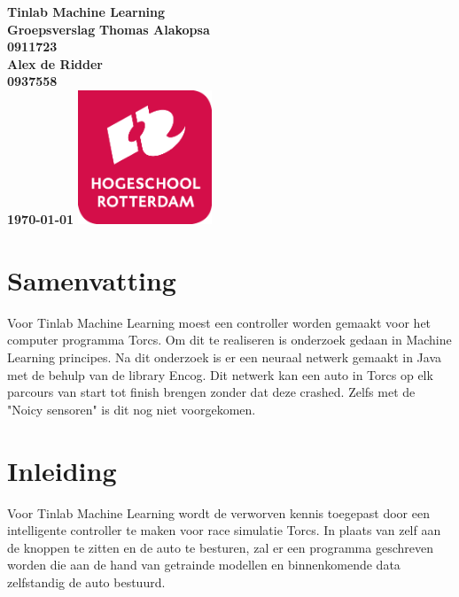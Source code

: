 \documentclass{article}
\begin{document}
\sffamily
\begin{titlepage}
  \centering
    \vfill
    {\bfseries\Huge
      Tinlab Machine Learning \\
      Groepsverslag
        \vskip2cm
      }
      {\bfseries\Large
      	Thomas Alakopsa\\
      	{ \bfseries\normalsize
      	0911723\\
      	}
      }
      {\bfseries\Large
      	Alex de Ridder\\
      	{ \bfseries\normalsize
      	0937558\\
      	}
      }
      {
        \bfseries\normalsize
        \vskip2cm
        \today
    }    
    \vfill
    \includegraphics[width=4cm]{logohr.png}
    \vfill
    \vfill
\end{titlepage}
\newpage

\section{Samenvatting}
Voor Tinlab Machine Learning moest een controller worden gemaakt voor het computer programma Torcs. Om dit te realiseren is onderzoek gedaan in Machine Learning principes. Na dit onderzoek is er een neuraal netwerk gemaakt in Java met de behulp van de library Encog. Dit netwerk kan een auto in Torcs op elk parcours 
van start tot finish brengen zonder dat deze crashed. Zelfs met de "Noicy sensoren" is dit nog niet voorgekomen. 

\section{Inleiding}
Voor Tinlab Machine Learning wordt de verworven kennis toegepast door een intelligente controller te maken voor race simulatie Torcs. In plaats van zelf aan de knoppen te zitten en de auto te besturen, zal er een programma geschreven worden die aan de hand van getrainde modellen en binnenkomende data zelfstandig de auto bestuurd. 
\end{document}
